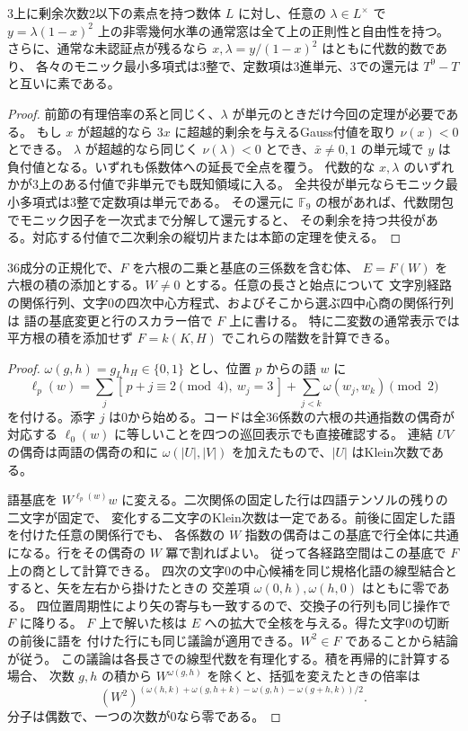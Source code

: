 \begin{corollary}
3上に剰余次数2以下の素点を持つ数体 $L$ に対し、任意の $\lambda\in L^\times$ で
$y=\lambda(1-x)^2$ 上の非零幾何水準の通常窓は全て上の正則性と自由性を持つ。
さらに、通常な未認証点が残るなら $x,\lambda=y/(1-x)^2$ はともに代数的数であり、
各々のモニック最小多項式は3整で、定数項は3進単元、3での還元は $T^9-T$ と互いに素である。
\end{corollary}
\begin{proof}
前節の有理倍率の系と同じく、$\lambda$ が単元のときだけ今回の定理が必要である。
もし $x$ が超越的なら $3x$ に超越的剰余を与えるGauss付値を取り $\nu(x)<0$ とできる。
$\lambda$ が超越的なら同じく $\nu(\lambda)<0$ とでき、$\bar x\ne0,1$ の単元域で
$y$ は負付値となる。いずれも係数体への延長で全点を覆う。
代数的な $x,\lambda$ のいずれかが3上のある付値で非単元でも既知領域に入る。
全共役が単元ならモニック最小多項式は3整で定数項は単元である。
その還元に $\mathbb F_9$ の根があれば、代数閉包でモニック因子を一次式まで分解して還元すると、
その剰余を持つ共役がある。対応する付値で二次剰余の縦切片または本節の定理を使える。
\end{proof}

\begin{proposition}\label{prop:rank-fifteen-word-parity-descent}
36成分の正規化で、$F$ を六根の二乗と基底の三係数を含む体、
$E=F(W)$ を六根の積の添加とする。$W\ne0$ とする。任意の長さと始点について
文字別経路の関係行列、文字0の四次中心方程式、およびそこから選ぶ四中心商の関係行列は
語の基底変更と行のスカラー倍で $F$ 上に書ける。
特に二変数の通常表示では平方根の積を添加せず $F=k(K,H)$ でこれらの階数を計算できる。
\end{proposition}
\begin{proof}
$\omega(g,h)=g_L h_H\in\{0,1\}$ とし、位置 $p$ からの語 $w$ に
\[
 \ell_p(w)=\sum_j[\,p+j\equiv2\pmod4,\ w_j=3\,]+\sum_{j<k}\omega(w_j,w_k)\pmod2
\]
を付ける。添字 $j$ は0から始める。コードは全36係数の六根の共通指数の偶奇が
対応する $\ell_0(w)$ に等しいことを四つの巡回表示でも直接確認する。
連結 $UV$ の偶奇は両語の偶奇の和に $\omega(|U|,|V|)$ を加えたもので、$|U|$ はKlein次数である。

語基底を $W^{\ell_p(w)}w$ に変える。二次関係の固定した行は四語テンソルの残りの二文字が固定で、
変化する二文字のKlein次数は一定である。前後に固定した語を付けた任意の関係行でも、
各係数の $W$ 指数の偶奇はこの基底で行全体に共通になる。行をその偶奇の $W$ 冪で割ればよい。
従って各経路空間はこの基底で $F$ 上の商として計算できる。
四次の文字0の中心候補を同じ規格化語の線型結合とすると、矢を左右から掛けたときの
交差項 $\omega(0,h),\omega(h,0)$ はともに零である。
四位置周期性により矢の寄与も一致するので、交換子の行列も同じ操作で $F$ に降りる。
$F$ 上で解いた核は $E$ への拡大で全核を与える。得た文字0の切断の前後に語を
付けた行にも同じ議論が適用できる。$W^2\in F$ であることから結論が従う。
この議論は各長さでの線型代数を有理化する。積を再帰的に計算する場合、
次数 $g,h$ の積から $W^{\omega(g,h)}$ を除くと、括弧を変えたときの倍率は
\[
 (W^2)^{(\omega(h,k)+\omega(g,h+k)-\omega(g,h)-\omega(g+h,k))/2}.
\]
分子は偶数で、一つの次数が0なら零である。
\end{proof}
